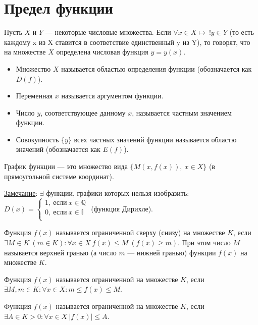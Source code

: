 \documentclass{article}
\begin{document}
    \section{Предел функции}
    \begin{definition}
        Пусть \(X\) и \(Y\) --- некоторые числовые множества. Если \(\forall x \in X \mapsto\ !y \in Y\) (то есть каждому x из X ставится в соответствие единственный y из Y), то говорят, что на множестве \(X\) определена числовая функция \(y = y(x)\).
        \begin{itemize}
            \item Множество \(X\) называется областью определения функции (обозначается как \(D(f)\)).
            \item Переменная \(x\) называется аргументом функции.
            \item Число \(y\), соответствующее данному \(x\), называется частным значением функции.
            \item Совокупность \(\{y\}\) всех частных значений функции называется областю значений (обозначается как \(E(f)\)).
        \end{itemize}
    \end{definition}
    \begin{definition}
        График функции --- это множество вида \(\{M(x, f(x)),\ x \in X\}\) (в прямоугольной системе координат). 
    \end{definition}
    \noindent
    \underline{Замечание}: \(\exists\)  функции, графики которых нельзя изобразить:
    \(D(x) = \begin{cases}
        1, \ \text{если}\ x \in \mathbb{Q}\\
        0, \ \text{если}\ x \in \mathbb{I}\\ 
    \end{cases}\) (функция Дирихле).
    \begin{definition}
        Функция \(f(x)\) называется ограниченной сверху (снизу) на множестве \(K\), если \(\exists M \in K\ (m \in K): \forall x \in X\ f(x) \leq M\ (f(x) \geq m)\). При этом число \(M\) называется верхней гранью (а число \(m\) --- нижней гранью) функции \(f(x)\) на множестве \(K\).      
    \end{definition}
    \begin{definition}[Ограниченность I]
        Функция \(f(x)\) называется ограниченной на множестве \(K\), если \(\exists M, m \in K: \forall x \in X: m \leq f(x) \leq M\).    
    \end{definition}
    \begin{definition}[Ограниченность II]
        Функция \(f(x)\) называется ограниченной на множестве \(K\), если \(\exists A \in K > 0: \forall x \in X\ |f(x)| \leq  A\).   
    \end{definition}
\end{document}
